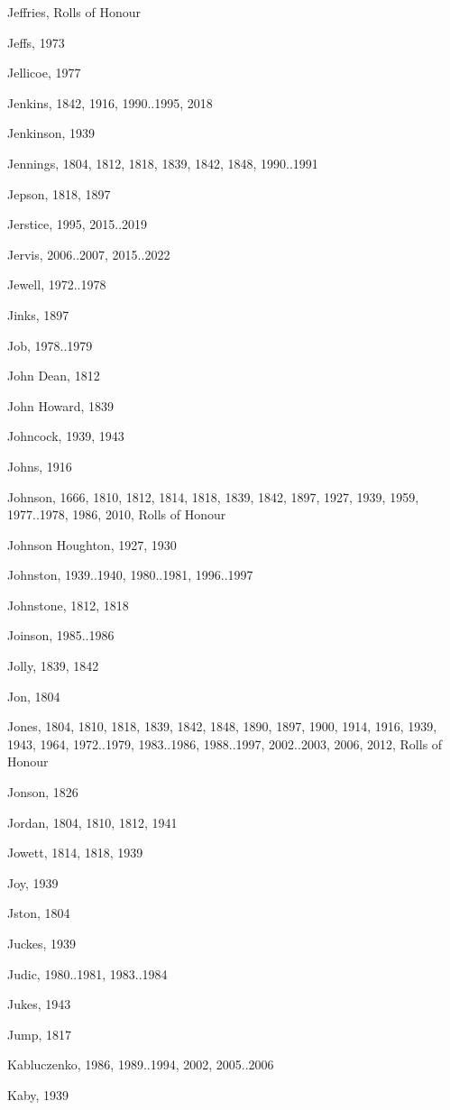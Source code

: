 {\begin{theindex}
\item Jeffries, Rolls of Honour
\item Jeffs, 1973
\item Jellicoe, 1977
\item Jenkins, 1842, 1916, 1990..1995, 2018
\item Jenkinson, 1939
\item Jennings, 1804, 1812, 1818, 1839, 1842, 1848, 1990..1991
\item Jepson, 1818, 1897
\item Jerstice, 1995, 2015..2019
\item Jervis, 2006..2007, 2015..2022
\item Jewell, 1972..1978
\item Jinks, 1897
\item Job, 1978..1979
\item John Dean, 1812
\item John Howard, 1839
\item Johncock, 1939, 1943
\item Johns, 1916
\item Johnson, 1666, 1810, 1812, 1814, 1818, 1839, 1842, 1897, 1927, 1939, 1959, 1977..1978, 1986, 2010, Rolls of Honour
\item Johnson Houghton, 1927, 1930
\item Johnston, 1939..1940, 1980..1981, 1996..1997
\item Johnstone, 1812, 1818
\item Joinson, 1985..1986
\item Jolly, 1839, 1842
\item Jon, 1804
\item Jones, 1804, 1810, 1818, 1839, 1842, 1848, 1890, 1897, 1900, 1914, 1916, 1939, 1943, 1964, 1972..1979, 1983..1986, 1988..1997, 2002..2003, 2006, 2012, Rolls of Honour
\item Jonson, 1826
\item Jordan, 1804, 1810, 1812, 1941
\item Jowett, 1814, 1818, 1939
\item Joy, 1939
\item Jston, 1804
\item Juckes, 1939
\item Judic, 1980..1981, 1983..1984
\item Jukes, 1943
\item Jump, 1817
\item Kabluczenko, 1986, 1989..1994, 2002, 2005..2006
\item Kaby, 1939

\end{theindex}}
